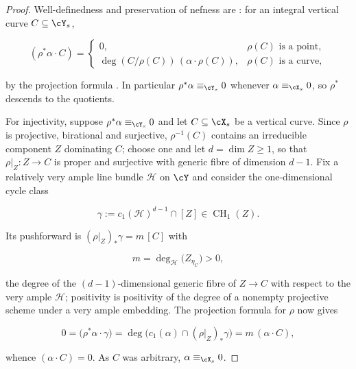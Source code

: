 \begin{proof}
Well-definedness and preservation of nefness are
: for an integral vertical curve
\(C\subseteq\cY_s\),

\begin{equation}
\label{eq:ch20-nef-pullback-test}
 (\rho^*\alpha\cdot C)=
 \begin{cases}
  0,&\rho(C)\text{ is a point},\\
  \deg(C/\rho(C))\,(\alpha\cdot\rho(C)),
       &\rho(C)\text{ is a curve},
 \end{cases}
\end{equation}

by the projection formula .  In
particular \(\rho^*\alpha\equiv_{\cY_s}0\) whenever
\(\alpha\equiv_{\cX_s}0\), so \(\rho^*\) descends to the quotients.

For injectivity, suppose \(\rho^*\alpha\equiv_{\cY_s}0\) and let
\(C\subseteq\cX_s\) be a vertical curve.  Since \(\rho\) is projective,
birational and surjective, \(\rho^{-1}(C)\) contains an irreducible
component \(Z\) dominating \(C\); choose one and let \(d=\dim Z\ge1\), so
that \(\rho|_Z:Z\to C\) is proper and surjective with generic fibre of
dimension \(d-1\).  Fix a relatively very ample line bundle \(\mathcal H\)
on \(\cY\) and consider the one-dimensional cycle class

\[
 \gamma:=c_1(\mathcal H)^{d-1}\cap[Z]\in\operatorname{CH}_1(Z).
\]

Its pushforward is \((\rho|_Z)_*\gamma=m\,[C]\) with

\begin{equation}
\label{eq:ch20-injectivity-cycle}
 m=\deg_{\mathcal H}\bigl(Z_{\eta_C}\bigr)>0,
\end{equation}

the degree of the \((d-1)\)-dimensional generic fibre of \(Z\to C\) with
respect to the very ample \(\mathcal H\); positivity is
positivity of the degree of a nonempty projective scheme under a very ample
embedding.  The projection formula for \(\rho\) now gives

\[
 0=\bigl(\rho^*\alpha\cdot\gamma\bigr)
  =\deg\bigl(c_1(\alpha)\cap(\rho|_Z)_*\gamma\bigr)
  =m\,(\alpha\cdot C),
\]

whence \((\alpha\cdot C)=0\).  As \(C\) was arbitrary,
\(\alpha\equiv_{\cX_s}0\).
\end{proof}

